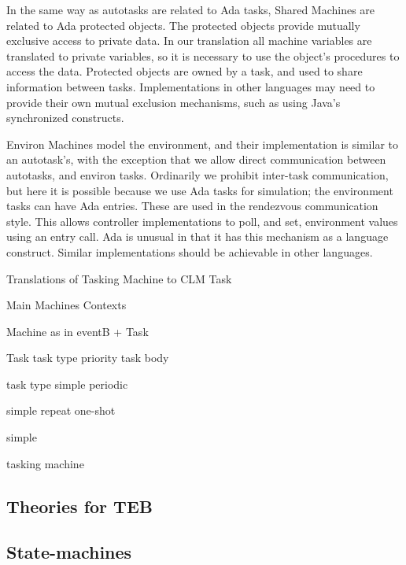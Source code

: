 In the same way as autotasks are related to Ada tasks, Shared Machines are related to Ada protected objects. The protected objects provide mutually exclusive access to private data. In our translation all machine variables are translated to private variables, so it is necessary to use the object's procedures to access the data. Protected objects are owned by a task, and used to share information between tasks. Implementations in other languages may need to provide their own mutual exclusion mechanisms, such as using Java's synchronized constructs. 

Environ Machines model the environment, and their implementation is similar to an autotask's, with the exception that we allow direct communication between autotasks, and environ tasks. Ordinarily we prohibit inter-task communication, but here it is possible because we use Ada tasks for simulation; the environment tasks can have Ada entries. These are used in the rendezvous communication style. This allows controller implementations to poll, and set, environment values using an entry call. Ada is unusual in that it has this mechanism as a language construct. Similar implementations should be achievable in other languages.

Translations of Tasking Machine to CLM  Task

Main
Machines
Contexts

Machine
as in eventB +
Task 

Task 
task type
priority
task body

task type
simple
periodic

simple
repeat
one-shot

simple



tasking machine

\subsection{Theories for TEB}

\subsection{State-machines}